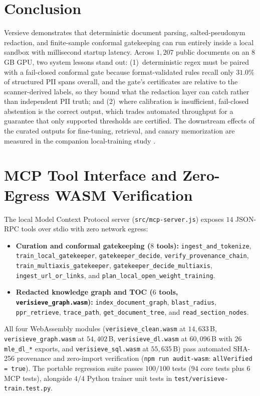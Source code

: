 \documentclass{article}
\begin{document}
\section{Conclusion}
\label{sec:conclusion}

Versieve demonstrates that deterministic document parsing, salted-pseudonym redaction, and finite-sample conformal gatekeeping can run entirely inside a local sandbox with millisecond startup latency. Across $1{,}207$ public documents on an 8\,GB GPU, two system lessons stand out: (1)~deterministic regex must be paired with a fail-closed conformal gate because format-validated rules recall only $31.0\%$ of structured PII spans overall, and the gate's certificates are relative to the scanner-derived labels, so they bound what the redaction layer can catch rather than independent PII truth; and (2)~where calibration is insufficient, fail-closed abstention is the correct output, which trades automated throughput for a guarantee that only supported thresholds are certified. The downstream effects of the curated outputs for fine-tuning, retrieval, and canary memorization are measured in the companion local-training study \citep{ardiyansyah2026localtraining}.




\newpage
\appendix
\section{MCP Tool Interface and Zero-Egress WASM Verification}
\label{sec:mcp}

The local Model Context Protocol server (\texttt{src/mcp-server.js}) exposes $14$ JSON-RPC tools over stdio with zero network egress:
\begin{itemize}
    \item \textbf{Curation and conformal gatekeeping ($8$ tools):} \texttt{ingest\_and\_tokenize}, \texttt{train\_local\_gatekeeper}, \texttt{gatekeeper\_decide}, \texttt{verify\_provenance\_chain}, \texttt{train\_multiaxis\_gatekeeper}, \texttt{gatekeeper\_decide\_multiaxis}, \texttt{ingest\_url\_or\_links}, and \texttt{plan\_local\_open\_weight\_training}.
    \item \textbf{Redacted knowledge graph and TOC ($6$ tools, \texttt{verisieve\_graph.wasm}):} \texttt{index\_document\_graph}, \texttt{blast\_radius}, \texttt{ppr\_retrieve}, \texttt{trace\_path}, \texttt{get\_document\_tree}, and \texttt{read\_section\_nodes}.
\end{itemize}

All four WebAssembly modules (\texttt{verisieve\_clean.wasm} at $14{,}633$\,B, \texttt{verisieve\_graph.wasm} at $54{,}402$\,B, \texttt{verisieve\_dl.wasm} at $60{,}096$\,B with $26$ \texttt{mle\_dl\_*} exports, and \texttt{verisieve\_sql.wasm} at $55{,}635$\,B) pass automated SHA-256 provenance and zero-import verification (\texttt{npm run audit-wasm}: \texttt{allVerified = true}). The portable regression suite passes $100/100$ tests ($94$ core tests plus $6$ MCP tests), alongside $4/4$ Python trainer unit tests in \texttt{test/verisieve-train.test.py}.
\end{document}
